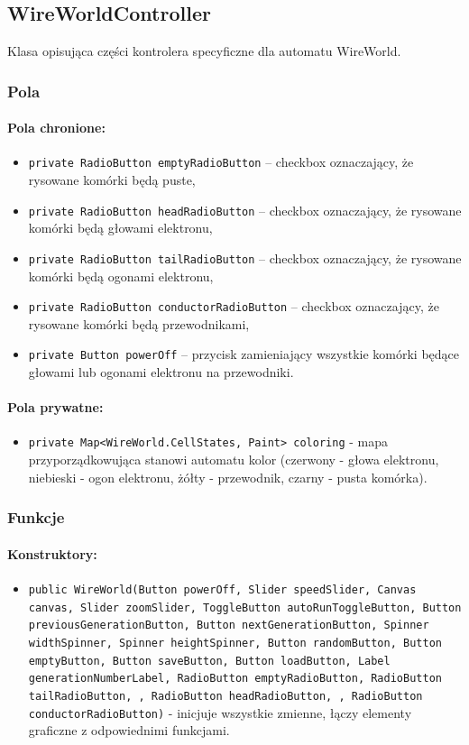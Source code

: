 \documentclass{report}
\begin{document}
\subsection{WireWorldController}
Klasa opisująca części kontrolera specyficzne dla automatu WireWorld.
\subsubsection{Pola}
\paragraph{Pola chronione:}
\begin{itemize}	\label{sec:checkbox}
	\item \texttt{private RadioButton emptyRadioButton} -- checkbox oznaczający, że rysowane komórki będą puste,
	\item \texttt{private RadioButton headRadioButton} -- checkbox oznaczający, że rysowane komórki będą głowami elektronu,
	\item \texttt{private RadioButton tailRadioButton} -- checkbox oznaczający, że rysowane komórki będą ogonami elektronu,
	\item \texttt{private RadioButton conductorRadioButton} -- checkbox oznaczający, że rysowane komórki będą przewodnikami,
	\item \texttt{private Button powerOff} -- przycisk zamieniający wszystkie komórki będące głowami lub ogonami elektronu na przewodniki.
\end{itemize}

\paragraph{Pola prywatne:}
\begin{itemize}
	\item \texttt{private Map<WireWorld.CellStates, Paint> coloring} - mapa przyporządkowująca stanowi automatu kolor (czerwony - głowa elektronu, niebieski - ogon elektronu, żółty - przewodnik, czarny - pusta komórka).
\end{itemize}
\subsubsection{Funkcje}
\paragraph{Konstruktory:}
\begin{itemize}
\item \texttt{public WireWorld(Button powerOff, Slider speedSlider, Canvas canvas, Slider zoomSlider, ToggleButton autoRunToggleButton, Button previousGenerationButton, Button nextGenerationButton, Spinner widthSpinner, Spinner heightSpinner, Button randomButton, Button emptyButton, Button saveButton, Button loadButton, Label generationNumberLabel, RadioButton emptyRadioButton, RadioButton tailRadioButton, , RadioButton headRadioButton, , RadioButton conductorRadioButton)} - inicjuje wszystkie zmienne, łączy elementy graficzne z odpowiednimi funkcjami.
\end{itemize}
\end{document}
